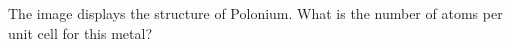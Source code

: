 \documentclass[main.tex]{subfiles}
\begin{document}
\begin{multicols*}{2}
\begin{question}[ID=\the\value{numA}]
The image displays the structure of Polonium. What is the number of atoms per unit cell for this metal?
\begin{center}
\scalebox{0.2}{
\begin{tikzpicture}
%
%
%

\end{tikzpicture}}
\end{center}
\end{question}
\end{multicols*}
\end{document}
